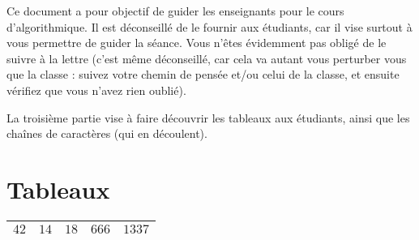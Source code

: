 \documentclass[11pt,a4paper]{article}
\begin{document}
\EncadreTitre

\bigskip


%
%

\bigskip


Ce document a pour objectif de guider les enseignants pour le cours d'algorithmique.
Il est déconseillé de le fournir aux étudiants, car il vise surtout à vous permettre de guider la séance.
Vous n'êtes évidemment pas obligé de le suivre à la lettre (c'est même déconseillé, car cela va autant vous perturber vous que la classe : suivez votre chemin de pensée et/ou celui de la classe, et ensuite vérifiez que vous n'avez rien oublié).

\medskip

La troisième partie vise à faire découvrir les tableaux aux étudiants, ainsi que les chaînes de caractères (qui en découlent).

\bigskip


\section{Tableaux}

\bigskip

\begin{table}[h!]
  \centering
  \begin{tabular}{| C{0.77cm} | C{0.77cm} | C{0.77cm} | C{0.77cm} | C{0.77cm} |}
  \hline
$ 42 $ & $ 14 $ & $ 18 $ & $ 666 $ & $ 1337 $ \\
  \hline
  \end{tabular}
\end{table}
\end{document}
